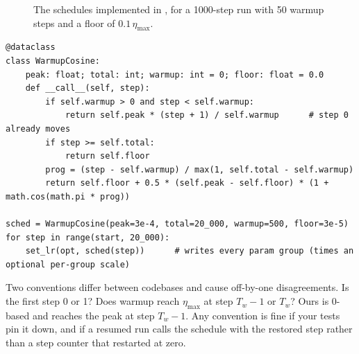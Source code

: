 \begin{figure}[t]
\centering
{}
\caption{The schedules implemented in , for a 1000-step run with 50 warmup
steps and a floor of $0.1\,\eta_{\max}$.}
\label{fig:optim:sched}
\end{figure}

\begin{lstlisting}[caption={Schedules are plain callables, so they are trivial to test, plot and checkpoint.},label={lst:optim:sched}]
@dataclass
class WarmupCosine:
    peak: float; total: int; warmup: int = 0; floor: float = 0.0
    def __call__(self, step):
        if self.warmup > 0 and step < self.warmup:
            return self.peak * (step + 1) / self.warmup      # step 0 already moves
        if step >= self.total:
            return self.floor
        prog = (step - self.warmup) / max(1, self.total - self.warmup)
        return self.floor + 0.5 * (self.peak - self.floor) * (1 + math.cos(math.pi * prog))

sched = WarmupCosine(peak=3e-4, total=20_000, warmup=500, floor=3e-5)
for step in range(start, 20_000):
    set_lr(opt, sched(step))      # writes every param group (times an optional per-group scale)
\end{lstlisting}

Two conventions differ between codebases and cause off-by-one disagreements. Is the first step
0 or 1? Does warmup reach $\eta_{\max}$ at step $T_w-1$ or $T_w$? Ours is 0-based and reaches the peak at
step $T_w-1$. Any convention is fine if your tests pin it down, and if a resumed run calls
the schedule with the restored step rather than a step counter that restarted at zero.

